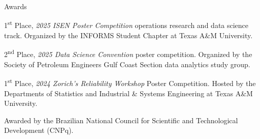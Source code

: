 \begin{cvcontentsection}{Awards}

\cvaward
    {1\textsuperscript{st} Place, \textit{2025 ISEN Poster Competition} operations research and data science track.}
    {Organized by the INFORMS Student Chapter at Texas A\&M University.}

\cvaward
    {2\textsuperscript{nd} Place, \textit{2025 Data Science Convention} poster competition.}
    {Organized by the Society of Petroleum Engineers Gulf Coast Section data analytics study group.}

\cvaward
    {1\textsuperscript{st} Place, \textit{2024 Zorich's Reliability Workshop} Poster Competition.}
    {Hosted by the Departments of Statistics and Industrial \& Systems Engineering at Texas A\&M University.}

    {Awarded by the Brazilian National Council for Scientific and Technological Development (CNPq).}

\end{cvcontentsection}
